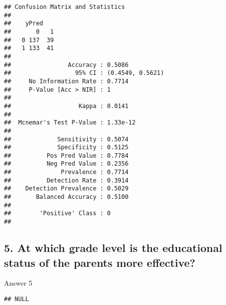 \documentclass[
]{article}
\newenvironment{Shaded}{\begin{snugshade}}{\end{snugshade}}
\newcommand{\AttributeTok}[1]{\textcolor[rgb]{0.77,0.63,0.00}{#1}}
\newcommand{\CommentTok}[1]{\textcolor[rgb]{0.56,0.35,0.01}{\textit{#1}}}
\newcommand{\NormalTok}[1]{#1}
\newcommand{\SpecialCharTok}[1]{\textcolor[rgb]{0.00,0.00,0.00}{#1}}
\newcommand{\StringTok}[1]{\textcolor[rgb]{0.31,0.60,0.02}{#1}}
\begin{document}
\begin{verbatim}
## Confusion Matrix and Statistics
## 
##    yPred
##       0   1
##   0 137  39
##   1 133  41
##                                           
##                Accuracy : 0.5086          
##                  95% CI : (0.4549, 0.5621)
##     No Information Rate : 0.7714          
##     P-Value [Acc > NIR] : 1               
##                                           
##                   Kappa : 0.0141          
##                                           
##  Mcnemar's Test P-Value : 1.33e-12        
##                                           
##             Sensitivity : 0.5074          
##             Specificity : 0.5125          
##          Pos Pred Value : 0.7784          
##          Neg Pred Value : 0.2356          
##              Prevalence : 0.7714          
##          Detection Rate : 0.3914          
##    Detection Prevalence : 0.5029          
##       Balanced Accuracy : 0.5100          
##                                           
##        'Positive' Class : 0               
## 
\end{verbatim}

\hypertarget{at-which-grade-level-is-the-educational-status-of-the-parents-more-effective}{%
\subsection{5. At which grade level is the educational status of the
parents more
effective?}\label{at-which-grade-level-is-the-educational-status-of-the-parents-more-effective}}

Answer 5

\begin{Shaded}
\end{Shaded}

\begin{verbatim}
## NULL
\end{verbatim}
\end{document}
